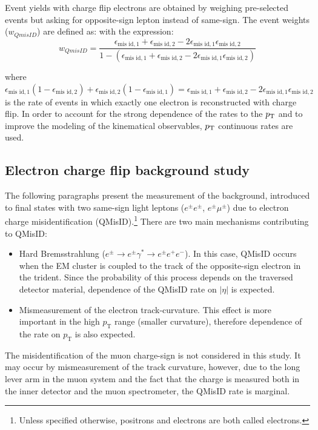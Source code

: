 Event yields with charge flip electrons are obtained by weighing pre-selected events but asking for 
opposite-sign lepton instead of same-sign. The event weights ($w_{QmisID}$) are defined as:
with the expression:
\begin{equation}
w_{QmisID} = \frac{\epsilon_{\textrm{mis id},1} + \epsilon_{\textrm{mis id},2} - 2\epsilon_{\textrm{mis id},1}\epsilon_{\textrm{mis id},2}}{1-(\epsilon_{\textrm{mis id},1} + \epsilon_{\textrm{mis id},2} - 2\epsilon_{\textrm{mis id},1}\epsilon_{\textrm{mis id},2})}
\label{eq:QmisID_weight}
\end{equation}

where $\epsilon_{\textrm{mis id},1}(1-\epsilon_{\textrm{mis
    id},2})+\epsilon_{\textrm{mis id},2}(1-\epsilon_{\textrm{mis id},1}) =
\epsilon_{\textrm{mis id},1} + \epsilon_{\textrm{mis id},2} -
2\epsilon_{\textrm{mis id},1}\epsilon_{\textrm{mis id},2}$ is the rate of
events in which exactly one electron is reconstructed with charge flip.
In order to account for the strong dependence of the rates to the $p_{\mathrm{T}}$ and to
improve the modeling of the kinematical observables, $p_{\mathrm{T}}$ continuous rates are used.

\subsection{Electron charge flip background study}

The following paragraphs present the measurement of the background, introduced to final states with two 
same-sign light leptons ($e^{\pm}e^{\pm}$, $e^{\pm}\mu^{\pm}$) due to electron charge misidentification 
(QMisID).\footnote{Unless specified otherwise, positrons and electrons are both called electrons.} There 
are two main mechanisms contributing to QMisID:
%
\begin{itemize}
  \item Hard Bremsstrahlung ($e^\pm \rightarrow e^\pm \gamma^* \rightarrow e^\pm e^+e^-$). In this 
  case, QMisID occurs when the EM cluster is coupled to the track of the opposite-sign electron 
  in the trident. Since the probability of this process depends on the traversed detector material, 
  dependence of the QMisID rate on $|\eta|$ is expected.
  \item Mismeasurement of the electron track-curvature. This effect is more important in the high 
  $p_{\mathrm T}$ range (smaller curvature), therefore dependence of the rate on $p_{\mathrm T}$ 
  is also expected.
\end{itemize}
%
The misidentification of the muon charge-sign is not considered in this study. It may occur by mismeasurement 
of the track curvature, however, due to the long lever arm in the muon system and the fact that the charge is 
measured both in the inner detector and the muon spectrometer, the QMisID rate is marginal.

